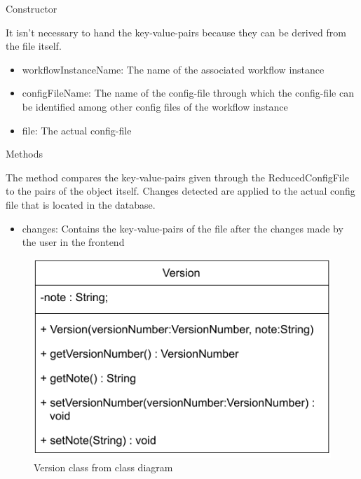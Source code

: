 \begin{methodenv}{Constructor}

It isn't necessary to hand the key-value-pairs because they can be derived from the file itself.

\begin{itemize}
	\item{workflowInstanceName:}
	The name of the associated workflow instance
	\item{configFileName:}
	The name of the config-file through which the config-file can be identified among other config files of the workflow instance
	\item{file:}
	The actual config-file
\end{itemize}
\end{methodenv}

\begin{methodenv}{Methods}


The method compares the key-value-pairs given through the ReducedConfigFile to the pairs of the object itself. Changes detected are applied to the actual config file that is located in the database.

\begin{itemize}
	\item{changes:}
	Contains the key-value-pairs of the file after the changes made by the user in the frontend
\end{itemize}
\end{methodenv}



\begin{figure}[h]
\centerline{\includegraphics[scale=1]{res/Klassen/Version.pdf}}
\caption{Version class from class diagram}
\end{figure}

